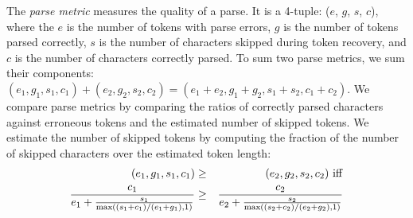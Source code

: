 The {\em parse metric}  measures the quality of a parse. It is a 
4-tuple: ($e$, $g$, $s$, $c$), where the $e$ is the number of tokens
with parse errors, $g$ is the number of tokens parsed correctly,
$s$ is the number of 
characters skipped during  token recovery, 
and $c$ is the number of characters correctly parsed. 
To sum two parse metrics, we sum their components:
$(e_1, g_1, s_1, c_1) + (e_2, g_2, s_2, c_2) = 
(e_1 + e_2, g_1 + g_2, s_1 + s_2, c_1 + c_2)$.
We compare parse metrics by comparing the ratios of correctly
parsed characters against erroneous tokens and the estimated number of
skipped tokens.  We estimate the number of skipped tokens
by computing the
fraction of the number of skipped characters over the estimated token
length:
\begin{eqnarray*}
(e_1, g_1, s_1, c_1) &\ge& (e_2, g_2, s_2, c_2)~ \rm{iff} \\
\frac{c_1}{e_1+\frac{s_1}{\max((s_1+c_1)/(e_1+g_1), 1)}} &\ge& 
\frac{c_2}{e_2+\frac{s_2}{\max((s_2+c_2)/(e_2+g_2), 1)}} \\
\end{eqnarray*}



